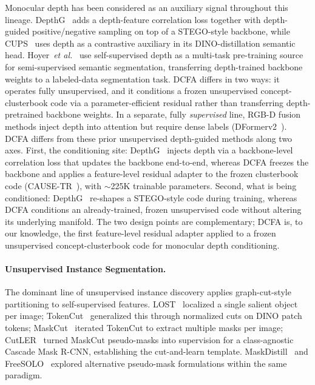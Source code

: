 \documentclass{article}
\newcommand{\etal}{\emph{et al.}}
\begin{document}
Monocular depth has been considered as an auxiliary signal throughout this lineage. DepthG~\cite{sick2024depthg} adds a depth-feature correlation loss together with depth-guided positive/negative sampling on top of a STEGO-style backbone, while CUPS~\cite{hahn2025cups} uses depth as a contrastive auxiliary in its DINO-distillation semantic head. Hoyer~\etal~\cite{hoyer2021threeways} use self-supervised depth as a multi-task pre-training source for semi-supervised semantic segmentation, transferring depth-trained backbone weights to a labeled-data segmentation task. DCFA differs in two ways: it operates fully unsupervised, and it conditions a frozen unsupervised concept-clusterbook code via a parameter-efficient residual rather than transferring depth-pretrained backbone weights. In a separate, fully \emph{supervised} line, RGB-D fusion methods inject depth into attention but require dense labels (DFormerv2~\cite{yin2025dformerv2}). DCFA differs from these prior unsupervised depth-guided methods along two axes. First, the conditioning site: DepthG~\cite{sick2024depthg} injects depth via a backbone-level correlation loss that updates the backbone end-to-end, whereas DCFA freezes the backbone and applies a feature-level residual adapter to the frozen clusterbook code (CAUSE-TR~\cite{kim2024cause}), with $\sim$225K trainable parameters. Second, what is being conditioned: DepthG~\cite{sick2024depthg} re-shapes a STEGO-style code during training, whereas DCFA conditions an already-trained, frozen unsupervised code without altering its underlying manifold. The two design points are complementary; DCFA is, to our knowledge, the first feature-level residual adapter applied to a frozen unsupervised concept-clusterbook code for monocular depth conditioning.

\paragraph{Unsupervised Instance Segmentation.}
The dominant line of unsupervised instance discovery applies graph-cut-style partitioning to self-supervised features. LOST~\cite{simeoni2021lost} localized a single salient object per image; TokenCut~\cite{wang2023tokencut} generalized this through normalized cuts on DINO patch tokens; MaskCut~\cite{wang2023cutler} iterated TokenCut to extract multiple masks per image; CutLER~\cite{wang2023cutler} turned MaskCut pseudo-masks into supervision for a class-agnostic Cascade Mask R-CNN, establishing the cut-and-learn template. MaskDistill~\cite{vangansbeke2022maskdistill} and FreeSOLO~\cite{wang2022freesolo} explored alternative pseudo-mask formulations within the same paradigm.
\end{document}
